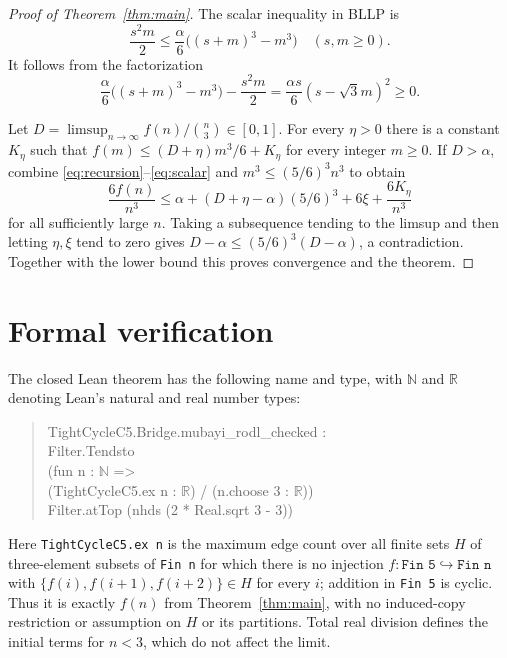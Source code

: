 \documentclass[11pt]{article}
\begin{document}
\begin{proof}[Proof of Theorem~\ref{thm:main}]
The scalar inequality in BLLP \cite[Fact~2.9(i)]{BLLP} is
\begin{equation}\label{eq:scalar}
 \frac{s^2m}{2}\le\frac\alpha6\bigl((s+m)^3-m^3\bigr)
 \quad(s,m\ge0).
\end{equation}
It follows from the factorization
\[
 \frac\alpha6\bigl((s+m)^3-m^3\bigr)-\frac{s^2m}{2}
 =\frac{\alpha s}{6}(s-\sqrt3m)^2\ge0.
\]

Let $D=\limsup_{n\to\infty} f(n)/\binom n3\in[0,1]$.
For every $\eta>0$ there is a constant $K_\eta$ such that
$f(m)\le(D+\eta)m^3/6+K_\eta$ for every integer $m\ge0$.
If $D>\alpha$, combine \eqref{eq:recursion}--\eqref{eq:scalar} and
$m^3\le(5/6)^3n^3$ to obtain
\[
 \frac{6f(n)}{n^3}\le\alpha+
   (D+\eta-\alpha)(5/6)^3+6\xi+\frac{6K_\eta}{n^3}
\]
for all sufficiently large $n$.
Taking a subsequence tending to the limsup and then letting $\eta,\xi$
tend to zero gives $D-\alpha\le(5/6)^3(D-\alpha)$, a contradiction.
Together with the lower bound this proves convergence and the theorem.
\end{proof}

\section{Formal verification}\label{sec:verification}
The closed Lean theorem has the following name and type, with
$\mathbb N$ and $\mathbb R$ denoting Lean's natural and real number types:
\begin{quote}\small\ttfamily\raggedright
TightCycleC5.Bridge.mubayi\_rodl\_checked :\\
Filter.Tendsto\\
\quad (fun n : $\mathbb N$ =>\\
\qquad (TightCycleC5.ex n : $\mathbb R$) / (n.choose 3 : $\mathbb R$))\\
\quad Filter.atTop (nhds (2 * Real.sqrt 3 - 3))
\end{quote}
Here \texttt{TightCycleC5.ex n} is the maximum edge count over all
finite sets $H$ of three-element subsets of \texttt{Fin n} for which
there is no injection $f:\texttt{Fin 5}\hookrightarrow\texttt{Fin n}$
with $\{f(i),f(i+1),f(i+2)\}\in H$ for every $i$; addition in
\texttt{Fin 5} is cyclic. Thus it is exactly $f(n)$ from
Theorem~\ref{thm:main}, with no induced-copy restriction or assumption
on $H$ or its partitions. Total real division defines the initial terms
for $n<3$, which do not affect the limit.
\end{document}

